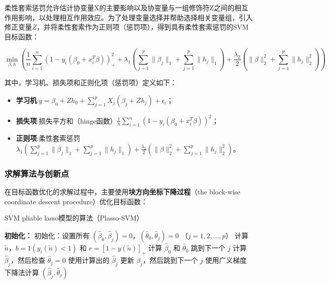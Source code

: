\documentclass[12pt]{article}  %
\begin{document}
柔性套索惩罚允许估计协变量X的主要影响以及协变量与一组修饰符Z之间的相互作用影响，以处理相互作用效应。为了处理变量选择并帮助选择相关变量组，引入修正变量$Z$，并将柔性套索作为正则项（惩罚项），得到具有柔性套索惩罚的SVM目标函数：

\begin{equation}
	\min_{\beta, h} \left( \frac{1}{n} \sum_{i=1}^n (1 - y_i (\beta_0 + x_i^T \beta))_+^2 + \lambda_1 \left( \sum_{j=1}^p \|\beta_j\|_1 + \sum_{j=1}^p \|h_j\|_1 \right) + \frac{\lambda_2}{2} \left( \|\beta\|_2^2 + \sum_{j=1}^p \|h_j\|_2^2 \right) \right)
\end{equation}

其中，学习机、损失项和正则化项（惩罚项）定义如下：

\begin{itemize}
	\setlength{\parsep}{0ex} %
	\setlength{\topsep}{2ex} %
	\setlength{\itemsep}{1ex} %
	\item \textbf{学习机}:$y = \beta_0 + Z h_0 + \sum_{j=1}^p X_j (\beta_j + Z h_j) + \epsilon_i$；		
	\item \textbf{损失项}:损失平方和（hinge函数）$\frac{1}{n} \sum_{i=1}^n (1 - y_i (\beta_0 + x_i^T \beta))^2$；
	\item \textbf{正则项}:柔性套索惩罚 $\lambda_1 \left( \sum_{j=1}^p \|\beta_j\|_1 + \sum_{j=1}^p \|h_j\|_1 \right) + \frac{\lambda_2}{2} \left( \|\beta\|_2^2 + \sum_{j=1}^p \|h_j\|_2^2 \right)$。
\end{itemize}

\subsubsection{求解算法与创新点}

在目标函数优化的求解过程中，主要使用\textbf{块方向坐标下降过程}（the block-wise coordinate descent procedure）优化目标函数：

\begin{algorithm}
	\caption{SVM pliable lasso模型的算法（Plasso-SVM）}
	\begin{algorithmic}[1]
		\STATE \textbf{初始化：}
		\STATE 初始化：设置所有 \((\hat{\beta}_0, \hat{\beta}_j) = 0\)，\((\hat{\theta}_0, \hat{\theta}_j) = 0\) （\(j = 1, 2, \ldots, p\)）
		\STATE 计算 \(\tilde{n}\)，\(b = 1(y_i(\tilde{n}) < 1)\) 和 \(r = [1 - y(\tilde{n})]_+\)
		\STATE 计算 \(\hat{\beta}_0\) 和 \(\hat{\theta}_0\)
		\STATE 跳到下一个 \(j\)
		\ELSE
		\STATE 计算 \(\hat{\beta}_j\)，然后检查 \(\hat{\theta}_j = 0\)
		\ENDIF
		\STATE 使用计算出的 \(\hat{\beta}_j\) 更新 \(\beta_j\)，然后跳到下一个 \(j\)
		\ELSE
		\STATE 使用广义梯度下降法计算 \((\hat{\beta}_j, \hat{\theta}_j)\)
		\ENDIF
		\ENDFOR
		\ENDFOR
	\end{algorithmic}
\end{algorithm}
\end{document}
